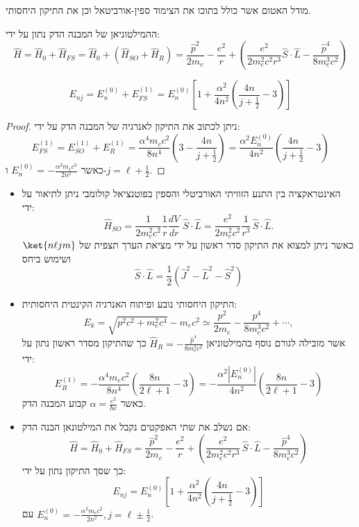 \documentclass{tstextbook}
\begin{document}
\begin{definition}
מודל האטום אשר כולל בתוכו את הצימוד ספין-אורביטאל וכן את התיקון היחסותי.

\end{definition}
\begin{corollary}
ההמילטוניאן של המבנה הדק נתון על ידי:
$$\hat{H}=\hat{H}_{0}+\hat{H}_{F S}=\hat{H}_{0}+\left(\hat{H}_{S O}+\hat{H}_{R}\right)=\frac{\hat{p}^{2}}{2m_{e}}-\frac{e^{2}}{r}+\left(\frac{e^{2}}{2m_{e}^{2}c^{2}r^{3}}\hat{S}\cdot\hat{L}-\frac{\hat{p}^{4}}{8m_{e}^{3}c^{2}}\right)$$

\end{corollary}
\begin{corollary}
$$E_{n j}=E_{n}^{(0)}+E_{F S}^{(1)}=E_{n}^{(0)}\left[1+\frac{\alpha^{2}}{4n^{2}}\left(\frac{4n}{j+\frac{1}{2}}-3\right)\right]$$

\end{corollary}
\begin{proof}
ניתן לכתוב את התיקון לאנרגיה של המבנה הדק על ידי:
$$E_{F S}^{(1)}=E_{S O}^{(1)}+E_{R}^{(1)}=\frac{\alpha^{4}m_{c}c^{2}}{8n^{4}}\left(3-\frac{4n}{j+\frac{1}{2}}\right)=\frac{\alpha^{2}E_{n}^{(0)}}{4n^{2}}\left(\frac{4n}{j+\frac{1}{2}}-3\right)$$
כאשר \(E_{n}^{(0)}=-\frac{\alpha^{2}m_{e}c^{2}}{2n^{2}}\) ו-\(j=\ell+\frac{1}{2}\).

\end{proof}
\begin{summary}
  \begin{itemize}
    \item האינטראקציה בין התנע הזוויתי האורביטלי והספין בפוטנציאל קולומבי ניתן לתיאור על ידי:
$$\hat{H}_{S O}=\frac{1}{2m_{e}^{2}c^{2}}\frac{1}{r}\frac{d V}{d r}\;\hat{S}\cdot\hat{L}=\frac{e^{2}}{2m_{e}^{2}c^{2}}\frac{1}{r^{3}}\,\hat{S}\cdot\hat{L}.$$
כאשר ניתן למצוא את התיקון סדר ראשון על ידי מציאת הערך תצפית של \(\ket{n\ell jm}\) ושימוש ביחס 
$$\hat{S}\cdot\hat{L}=\frac{1}{2}\left(\hat{J}^{2}-\hat{L}^{2}-\hat{S}^{2}\right)$$
    \item התיקון היחסותי נובע ופיתוח האנרגיה הקינטית היחסותית:
$$E_{k}=\sqrt{p^{2}c^{2}+m_{e}^{2}c^{4}}-m_{e}c^{2}\simeq\frac{p^{2}}{2m_{e}}-\frac{p^{4}}{8m_{e}^{3}c^{2}}+\cdots,$$
אשר מובילה לגורם נוסף בהמילטוניאן \(\hat{H}_{R}=-\frac{\hat{p}^{4}}{8m_{e}^{3}c^{2}}\) כך שהתיקון מסדר ראשון נתון על ידי:
$$E_{R}^{(1)}=-\frac{\alpha^{4}m_{e}c^{2}}{8n^{4}}\left(\frac{8n}{2\ell+1}-3\right)=-\frac{\alpha^{2}|E_{n}^{(0)}|}{4n^{2}}\left(\frac{8n}{2\ell+1}-3\right)$$
כאשר \(\alpha=\frac{e^{2}}{\hbar c}\) קבוע המבנה הדק.
    \item אם נשלב את שתי האפקטים נקבל את המילטונאן הבנה הדק:
$$\hat{H}=\hat{H}_{0}+\hat{H}_{F S}=\frac{\hat{p}^{2}}{2m_{e}}-\frac{e^{2}}{r}+\left(\frac{e^{2}}{2m_{e}^{2}c^{2}r^{3}}\,\hat{S}\cdot\hat{L}-\frac{\hat{p}^{4}}{8m_{e}^{3}c^{2}}\right)$$
כך שסך התיקון נתון על ידי:
$$E_{n j}=E_{n}^{(0)}\left[1+\frac{\alpha^{2}}{4n^{2}}\left(\frac{4n}{j+\frac{1}{2}}-3\right)\right]$$
עם \(E_{n}^{(0)}=-\frac{\alpha^{2}m_{e}c^{2}}{2n^{2}},j=\ell\pm\frac{1}{2}\).
  \end{itemize}
\end{summary}
\end{document}
